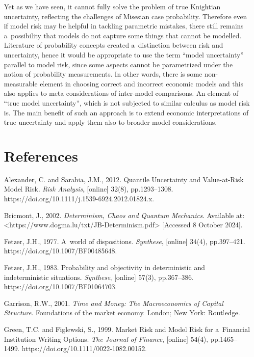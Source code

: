 Yet as we have seen, it cannot fully solve the problem of true Knightian uncertainty, reflecting the challenges of Misesian case probability. Therefore even if model risk may be helpful in tackling parametric mistakes, there still remains a~possibility that models do not capture some things that cannot be modelled. Literature of probability concepts created a~distinction between risk and uncertainty, hence it would be appropriate to use the term ``model uncertainty'' parallel to model risk, since some aspects cannot be parametrized under the notion of probability measurements. In other words, there is some non-measurable element in choosing correct and incorrect economic models and this also applies to meta considerations of inter-model comparisons. An element of ``true model uncertainty'', which is not subjected to similar calculus as model risk is. The main benefit of such an approach is to extend economic interpretations of true uncertainty and apply them also to broader model considerations.



\section{References}

Alexander, C. and Sarabia, J.M., 2012. Quantile Uncertainty and Value-at-Risk Model Risk. \textit{Risk Analysis}, [online] 32(8), pp.1293–1308. https://doi.org/10.1111/j.1539-6924.2012.01824.x.



Bricmont, J., 2002. \textit{Determinism, Chaos and Quantum Mechanics.} Available at: {\textless}https://www.dogma.lu/txt/JB-Determinism.pdf{\textgreater} [Accessed 8 October 2024].



Fetzer, J.H., 1977. A~world of dispositions. \textit{Synthese}, [online] 34(4), pp.397–421. https://doi.org/10.1007/BF00485648.



Fetzer, J.H., 1983. Probability and objectivity in deterministic and indeterministic situations. \textit{Synthese}, [online] 57(3), pp.367–386. https://doi.org/10.1007/BF01064703.



Garrison, R.W., 2001. \textit{Time and Money: The Macroeconomics of Capital Structure}. Foundations of the market economy. London; New York: Routledge.



Green, T.C. and Figlewski, S., 1999. Market Risk and Model Risk for a~Financial Institution Writing Options. \textit{The Journal of Finance}, [online] 54(4), pp.1465–1499. https://doi.org/10.1111/0022-1082.00152.




